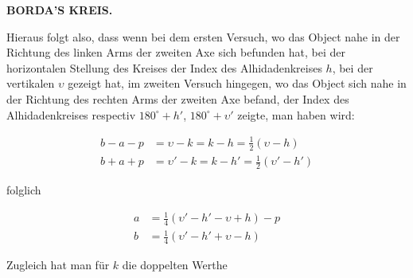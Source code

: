 \clearpage
\endgroup
\begingroup
\pagestyle{empty}
\newcommand{\GaussVICitation}[2]{%
  \begin{center}
  \parbox{#1\linewidth}{%
    \centering\footnotesize\frenchspacing
    \hrule height .3pt\relax\vspace{2.5pt}
    #2\par
    \vspace{2.5pt}\hrule height .3pt\relax
  }%
  \end{center}
  \par\nobreak\medskip
}
\newcommand{\GaussVIGathering}[2]{%
  \fancypagestyle{gaussVIGathering}{%
    \fancyhf{}%
    \renewcommand{\headrulewidth}{0pt}%
    \renewcommand{\footrulewidth}{0pt}%
    \fancyfoot[C]{\makebox[\textwidth][l]{%
      \hspace*{.025\textwidth}{\footnotesize\bfseries #1}\hfill
      {\normalsize\bfseries\textls[90]{#2}}\hspace*{.18\textwidth}}}%
  }%
  \thispagestyle{gaussVIGathering}%
}
\noindent{}%
\makebox[12mm][l]{}%
\parbox[t]{\dimexpr\linewidth-24mm\relax}{\centering\footnotesize\bfseries BORDA’S KREIS.\par}%
\par\nobreak\medskip
\par\indent Hieraus folgt also, dass wenn bei dem ersten Versuch, wo das Object nahe in der Richtung des linken Arms der zweiten Axe sich befunden hat, bei der horizontalen Stellung des Kreises der Index des Alhidadenkreises $h$, bei der vertikalen $\upsilon$ gezeigt hat, im zweiten Versuch hingegen, wo das Object sich nahe in der Richtung des rechten Arms der zweiten Axe befand, der Index des Alhidadenkreises respectiv $180^\circ+h'$, $180^\circ+\upsilon'$ zeigte, man haben wird:

\[ \begin{aligned} b-a-p &= \upsilon-k = k-h = \tfrac{1}{2}(\upsilon-h) \\ b+a+p &= \upsilon'-k = k-h' = \tfrac{1}{2}(\upsilon'-h') \end{aligned} \]

\noindent folglich

\[ \begin{aligned} a &= \tfrac{1}{4}(\upsilon'-h'-\upsilon+h)-p \\ b &= \tfrac{1}{4}(\upsilon'-h'+\upsilon-h) \end{aligned} \]

\noindent Zugleich hat man für $k$ die doppelten Werthe

